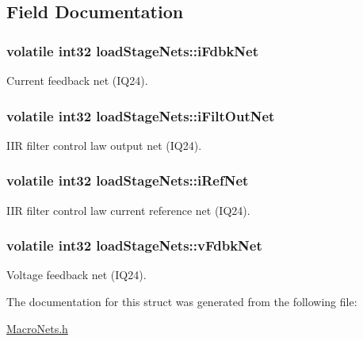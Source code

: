 \subsection{Field Documentation}
\hypertarget{a00007_aa580f4cffe5e06aef9a2448f5d7c7306}{
\subsubsection[{i\-Fdbk\-Net}]{\setlength{\rightskip}{0pt plus 5cm}volatile int32 load\-Stage\-Nets\-::i\-Fdbk\-Net}}\label{a00007_aa580f4cffe5e06aef9a2448f5d7c7306}
Current feedback net (I\-Q24). \hypertarget{a00007_aac9cfbda42e3756f1b41bede20f80420}{
\subsubsection[{i\-Filt\-Out\-Net}]{\setlength{\rightskip}{0pt plus 5cm}volatile int32 load\-Stage\-Nets\-::i\-Filt\-Out\-Net}}\label{a00007_aac9cfbda42e3756f1b41bede20f80420}
I\-I\-R filter control law output net (I\-Q24). \hypertarget{a00007_ac3bbae6daf15cd711f6caa262de6433b}{
\subsubsection[{i\-Ref\-Net}]{\setlength{\rightskip}{0pt plus 5cm}volatile int32 load\-Stage\-Nets\-::i\-Ref\-Net}}\label{a00007_ac3bbae6daf15cd711f6caa262de6433b}
I\-I\-R filter control law current reference net (I\-Q24). \hypertarget{a00007_ac2c84f99c821ff9022e6792f338155f5}{
\subsubsection[{v\-Fdbk\-Net}]{\setlength{\rightskip}{0pt plus 5cm}volatile int32 load\-Stage\-Nets\-::v\-Fdbk\-Net}}\label{a00007_ac2c84f99c821ff9022e6792f338155f5}
Voltage feedback net (I\-Q24). 

The documentation for this struct was generated from the following file\-:\begin{DoxyCompactItemize}
\item 
\hyperlink{a00027}{Macro\-Nets.\-h}\end{DoxyCompactItemize}
